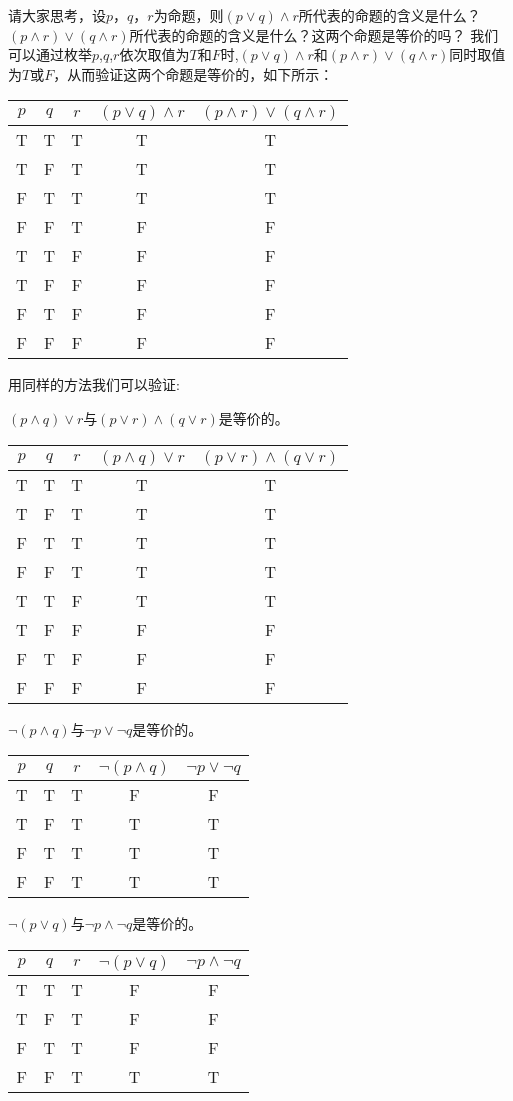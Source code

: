 \documentclass{article}
\begin{document}
\begin{CJK}{UTF8}{gbsn}
  请大家思考，设$p$，$q$，$r$为命题，则$(p\lor q)\land r$所代表的命题的含义是什么？$(p\land r)\lor (q \land r)$所代表的命题的含义是什么？这两个命题是等价的吗？
  我们可以通过枚举$p$,$q$,$r$依次取值为$T$和$F$时,$(p\lor q)\land r$和$(p\land r)\lor (q \land r)$同时取值为$T$或$F$，从而验证这两个命题是等价的，如下所示：

    \begin{tabular}{ccc|cc}
    $p$& $q$& $r$& $(p\lor q)\land r$&$(p\land r)\lor (q \land r)$\\
    \hline
    T&T&T&T&T\\
    T&F&T&T&T\\
    F&T&T&T&T\\
      F&F&T&F&F\\
    T&T&F&F&F\\
    T&F&F&F&F\\
    F&T&F&F&F\\
      F&F&F&F&F\\      
  \end{tabular}

  用同样的方法我们可以验证:

  $(p\land q)\lor r$与$(p\lor r)\land (q \lor r)$是等价的。

      \begin{tabular}{ccc|cc}
    $p$& $q$& $r$&$(p\land q)\lor r$ &$(p\lor r)\land (q \lor r)$\\
    \hline
    T&T&T&T&T\\
    T&F&T&T&T\\
    F&T&T&T&T\\
      F&F&T&T&T\\
    T&T&F&T&T\\
    T&F&F&F&F\\
    F&T&F&F&F\\
        F&F&F&F&F\\
  \end{tabular}


  $\lnot (p\land q)$与$\lnot p \lor \lnot q$是等价的。

      \begin{tabular}{ccc|cc}
    $p$& $q$& $r$&$\lnot (p\land q)$ &$\lnot p \lor \lnot q$\\
    \hline
    T&T&T&F&F\\
    T&F&T&T&T\\
    F&T&T&T&T\\
      F&F&T&T&T\\      
  \end{tabular}


  $\lnot (p \lor q)$与$\lnot p \land \lnot q$是等价的。
  
      \begin{tabular}{ccc|cc}
    $p$& $q$& $r$&$\lnot (p \lor q)$&$\lnot p \land \lnot q$\\
    \hline
    T&T&T&F&F\\
    T&F&T&F&F\\
    F&T&T&F&F\\
    F&F&T&T&T\\      
  \end{tabular}


\end{CJK}
\end{document}
